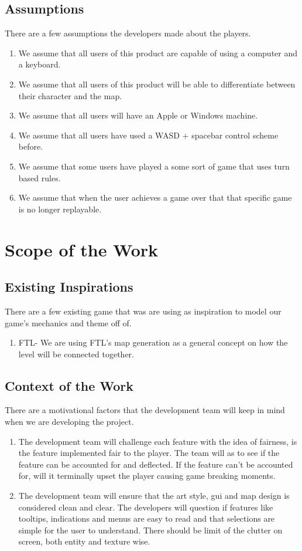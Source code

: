 \documentclass{article}
\begin{document}
\subsection{Assumptions}
\quad There are a few assumptions the developers made about the players.
\begin{enumerate}[{A}1. ]
	\item We assume that all users of this product are capable of using a computer and a keyboard. 
	\item We assume that all users of this product will be able to differentiate between their character and the map.
	\item We assume that all users will have an Apple or Windows machine.
	\item We assume that all users have used a WASD + spacebar control scheme before.
	\item We assume that some users have played a some sort of game that uses turn based rules.
	\item We assume that when the user achieves a game over that that specific game is no longer replayable.
\end{enumerate}
\section{Scope of the Work}
\subsection{Existing Inspirations}
\quad There are a few existing game that was are using as inspiration to model our game's mechanics and theme off of.
\begin{enumerate}[{EI}1. ]
	\item FTL- We are using FTL's map generation as a general concept on how the level will be connected together. 


\end{enumerate}
\subsection{Context of the Work}
\quad There are a motivational factors that the development team will keep in mind when we are developing the project.
\begin{enumerate}[{CW}1. ]
	\item The development team will challenge each feature with the idea of fairness, is the feature implemented fair to the player. The team will as to see if the feature can be accounted for and deflected. If the feature can't be accounted for, will it terminally upset the player causing game breaking moments.
	\item The development team will ensure that the art style, gui and map design is considered clean and clear. The developers will question if features like tooltips, indications and menus are easy to read and that selections are simple for the user to understand.  There should be limit of the clutter on screen, both entity and texture wise.
\end{enumerate}
\end{document}
